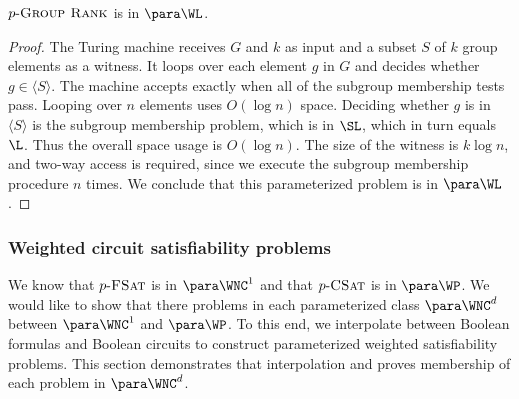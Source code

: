
\begin{theorem}\label{thm:pgrouprank}
  $p\textnormal{-}\textsc{Group Rank}$ is in $\para \WL$.
\end{theorem}
\begin{proof}
  The Turing machine receives $G$ and $k$ as input and a subset $S$ of $k$ group elements as a witness.
  It loops over each element $g$ in $G$ and decides whether $g \in \langle{S}\rangle$.
  The machine accepts exactly when all of the subgroup membership tests pass.
  Looping over $n$ elements uses $O(\log n)$ space.
  Deciding whether $g$ is in $\langle{S}\rangle$ is the subgroup membership problem, which is in $\SL$, which in turn equals $\L$.
  Thus the overall space usage is $O(\log n)$.
  The size of the witness is $k \log n$, and two-way access is required, since we execute the subgroup membership procedure $n$ times.
  We conclude that this parameterized problem is in $\para \WL$.
\end{proof}


\subsubsection{Weighted circuit satisfiability problems}

%
%
%
We know that $p \textnormal{-} \textsc{FSat}$ is in $\para \WNC^1$ and that $p \textnormal{-} \textsc{CSat}$ is in $\para \WP$.
%
%
%
We would like to show that there problems in each parameterized class $\para \WNC^d$ between $\para \WNC^1$ and $\para \WP$.
%
%
%
To this end, we interpolate between Boolean formulas and Boolean circuits to construct parameterized weighted satisfiability problems.
%
%
%
This section demonstrates that interpolation and proves membership of each problem in $\para \WNC^d$.

